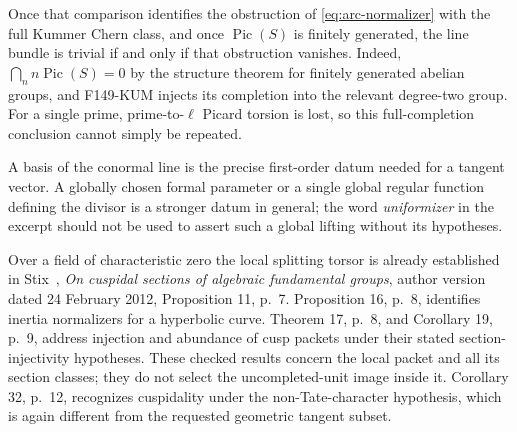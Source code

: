 \documentclass[11pt,a4paper]{article}
\theoremstyle{definition}
\begin{document}
Once that comparison identifies the obstruction of
\eqref{eq:arc-normalizer} with the full Kummer Chern class, and once
\(\operatorname{Pic}(S)\) is finitely generated, the line bundle is
trivial if and only if that obstruction vanishes.  Indeed,
\(\bigcap_n n\operatorname{Pic}(S)=0\) by the structure theorem for
finitely generated abelian groups, and F149-KUM injects its completion
into the relevant degree-two group.  For a single prime, prime-to-\(\ell\)
Picard torsion is lost, so this full-completion conclusion cannot
simply be repeated.

A basis of the conormal line is the precise first-order datum needed
for a tangent vector.  A globally chosen formal parameter or a single
global regular function defining the divisor is a stronger datum in
general; the word \emph{uniformizer} in the excerpt should not be used
to assert such a global lifting without its hypotheses.

Over a field of characteristic zero the local splitting torsor is
already established in Stix~\cite{StixCuspidal2012}, \emph{On cuspidal sections of algebraic
fundamental groups}, author version dated 24 February 2012,
Proposition 11, p.~7.  Proposition 16, p.~8, identifies inertia
normalizers for a hyperbolic curve.  Theorem 17, p.~8, and Corollary 19,
p.~9, address injection and abundance of cusp packets under their
stated section-injectivity hypotheses.  These checked results concern
the local packet and all its section classes; they do not select the
uncompleted-unit image inside it.  Corollary 32, p.~12, recognizes
cuspidality under the non-Tate-character hypothesis, which is again
different from the requested geometric tangent subset.
\end{document}
